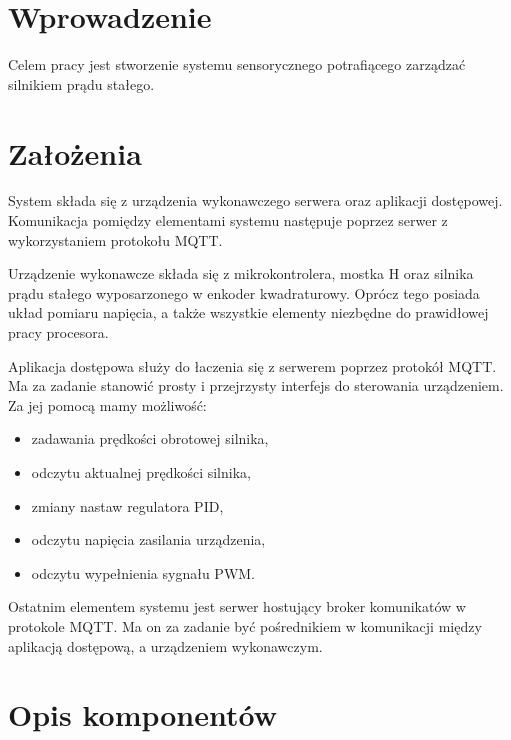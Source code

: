 \documentclass[a4paper, 12pt]{article}
\begin{document}
  

  \leavevmode\thispagestyle{empty}\newpage %


  \tableofcontents
  
  \section{Wprowadzenie}
  
  Celem pracy jest stworzenie systemu sensorycznego 
  potrafiącego zarządzać silnikiem prądu stałego.
  

  \section{Założenia}

  System składa się z urządzenia wykonawczego serwera 
  oraz aplikacji dostępowej. 
  Komunikacja pomiędzy elementami systemu 
  następuje poprzez serwer z wykorzystaniem protokołu MQTT.
  
  Urządzenie wykonawcze składa się z mikrokontrolera,
  mostka H oraz silnika prądu stałego wyposarzonego w enkoder
  kwadraturowy. Oprócz tego posiada układ pomiaru napięcia, a
  także wszystkie elementy niezbędne do prawidłowej pracy 
  procesora.

  Aplikacja dostępowa służy do łaczenia się z serwerem 
  poprzez protokół MQTT. Ma za zadanie stanowić prosty i 
  przejrzysty interfejs do sterowania urządzeniem.
  Za jej pomocą mamy możliwość:
  
  \begin{itemize}
    \item zadawania prędkości obrotowej silnika,
    \item odczytu aktualnej prędkości silnika,
    \item zmiany nastaw regulatora PID,
    \item odczytu napięcia zasilania urządzenia,
    \item odczytu wypełnienia sygnału PWM.
  \end{itemize}
  
  Ostatnim elementem systemu jest serwer hostujący broker
  komunikatów w protokole MQTT. Ma on za zadanie być
  pośrednikiem w komunikacji między aplikacją dostępową,
  a urządzeniem wykonawczym.

  \section{Opis komponentów}
\end{document}
